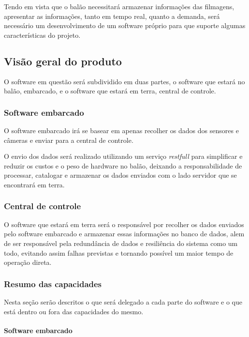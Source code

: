 Tendo em vista que o balão necessitará armazenar informações das filmagens, apresentar as informações, tanto em tempo real, quanto a demanda, será necessário um desenvolvimento de um software próprio para que suporte algumas características do projeto.

\subsection{Visão geral do produto}

O software em questão será subdividido em duas partes, o software que estará no balão, embarcado, e o software que estará em terra, central de controle.

\subsubsection{Software embarcado}

O software embarcado irá se basear em apenas recolher os dados dos sensores e câmeras e enviar para a central de controle.

O envio dos dados será realizado utilizando um serviço \textit{restfull} para simplificar e reduzir os custos e o peso de hardware no balão, deixando a responsabilidade de processar, catalogar e armazenar os dados enviados com o lado servidor que se encontrará em terra.

\subsubsection{Central de controle}

O software que estará em terra será o responsável por recolher os dados enviados pelo software embarcado e armazenar essas informações no banco de dados, alem de ser responsável pela redundância de dados e resiliência do sistema como um todo, evitando assim falhas previstas e tornando possível um maior tempo de operação direta.

\subsubsection{Resumo das capacidades}

Nesta seção serão descritos o que será delegado a cada parte do software e o que está dentro ou fora das capacidades do mesmo.

\paragraph{Software embarcado}

